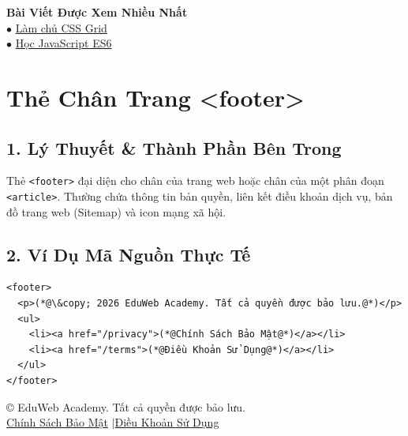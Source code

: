 \documentclass[11pt,oneside]{book}
\newcommand{\codeinline}[1]{\textcolor{accentOrange}{\texttt{#1}}}
\begin{document}
\begin{browserWindow}
\sffamily\small
\begin{tcolorbox}[colback=secondaryTeal!5, colframe=secondaryTeal!30, width=0.75\linewidth, arc=5pt]
{\bfseries\color{secondaryTeal} Bài Viết Được Xem Nhiều Nhất}\\[4pt]
$\bullet$ \textcolor{primaryBlue}{\underline{Làm chủ CSS Grid}}\\[2pt]
$\bullet$ \textcolor{primaryBlue}{\underline{Học JavaScript ES6}}
\end{tcolorbox}
\end{browserWindow}

\section{Thẻ Chân Trang <footer>}
\subsection{1. Lý Thuyết \& Thành Phần Bên Trong}
Thẻ \codeinline{<footer>} đại diện cho chân của trang web hoặc chân của một phân đoạn \codeinline{<article>}. Thường chứa thông tin bản quyền, liên kết điều khoản dịch vụ, bản đồ trang web (Sitemap) và icon mạng xã hội.

\subsection{2. Ví Dụ Mã Nguồn Thực Tế}
\begin{codeWindow}
\begin{lstlisting}[language=HTML5]
<footer>
  <p>(*@\&copy; 2026 EduWeb Academy. Tất cả quyền được bảo lưu.@*)</p>
  <ul>
    <li><a href="/privacy">(*@Chính Sách Bảo Mật@*)</a></li>
    <li><a href="/terms">(*@Điều Khoản Sử Dụng@*)</a></li>
  </ul>
</footer>
\end{lstlisting}
\end{codeWindow}

\begin{browserWindow}
\sffamily\small
\begin{tcolorbox}[colback=gray!10, colframe=gray!30, arc=4pt]
\centering
\small \copyright{} EduWeb Academy. Tất cả quyền được bảo lưu.\\[3pt]
\textcolor{primaryBlue}{\underline{Chính Sách Bảo Mật}} \quad$\vert$\quad \textcolor{primaryBlue}{\underline{Điều Khoản Sử Dụng}}
\end{tcolorbox}
\end{browserWindow}
\end{document}
